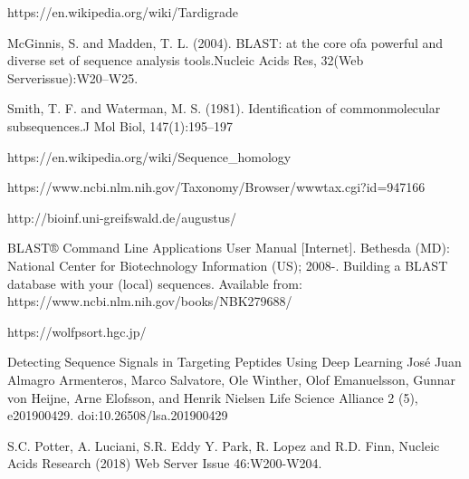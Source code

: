 \documentclass{article}
\begin{document}
 
 
\begin{thebibliography}{9}
	
	https://en.wikipedia.org/wiki/Tardigrade
	
	  McGinnis, S. and Madden, T. L. (2004). BLAST: at the core ofa powerful and diverse set of sequence analysis tools.Nucleic Acids Res, 32(Web Serverissue):W20--W25.
	
	Smith, T. F. and Waterman, M. S. (1981). Identification of commonmolecular subsequences.J Mol Biol, 147(1):195--197
	
	
	https://en.wikipedia.org/wiki/Sequence\_homology
	
	
 https://www.ncbi.nlm.nih.gov/Taxonomy/Browser/wwwtax.cgi?id=947166

http://bioinf.uni-greifswald.de/augustus/


 BLAST® Command Line Applications User Manual [Internet]. Bethesda (MD): National Center for Biotechnology Information (US); 2008-. Building a BLAST database with your (local) sequences. Available from: https://www.ncbi.nlm.nih.gov/books/NBK279688/
 
 https://wolfpsort.hgc.jp/
 
  Detecting Sequence Signals in Targeting Peptides Using Deep Learning
 José Juan Almagro Armenteros, Marco Salvatore, Ole Winther, Olof Emanuelsson, Gunnar von Heijne, Arne Elofsson, and Henrik Nielsen
 Life Science Alliance 2 (5), e201900429. doi:10.26508/lsa.201900429 
 
 S.C. Potter, A. Luciani, S.R. Eddy Y. Park, R. Lopez and R.D. Finn,
 Nucleic Acids Research (2018) Web Server Issue 46:W200-W204. 
 
\end{thebibliography}
\end{document}

